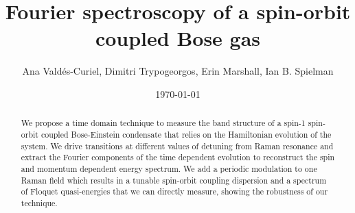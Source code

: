 \documentclass{iopart}
\begin{document}
		
\title{Fourier spectroscopy of a spin-orbit coupled Bose gas}
	
\author{Ana Vald\'es-Curiel, Dimitri Trypogeorgos, Erin Marshall, Ian B. Spielman}
\address{Joint Quantum Institute, University of Maryland and National Institute of Standards and Technology, College Park, Maryland, 20742, USA}
\date{\today}

\begin{abstract}
	
	 We propose a time domain technique to measure the band structure of a spin-1 spin-orbit coupled Bose-Einstein condensate that relies on the Hamiltonian evolution of the system. We drive transitions at different values of detuning from Raman resonance and extract the Fourier components of the time dependent evolution to reconstruct the spin and momentum dependent energy spectrum. We add a periodic modulation to one Raman field which results in a tunable spin-orbit coupling dispersion and a spectrum of Floquet quasi-energies that we can directly measure, showing the robustness of our technique.  
\end{abstract}

\maketitle
\tableofcontents











%



 
\end{document}
